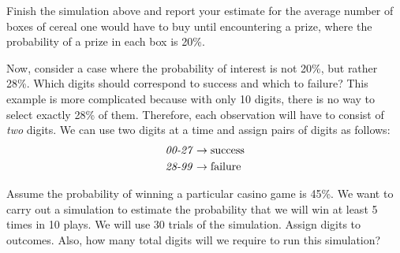 \begin{exercisewrap}
\begin{nexercise}Finish the simulation above and report your estimate for the average number of boxes of cereal one would have to buy until encountering a prize, where the probability of a prize in each box is 20\%.\footnotemark
\end{nexercise}
\end{exercisewrap}



\begin{examplewrap}
\begin{nexample}{Now, consider a case where the probability of interest is not 20\%, but rather 28\%. Which digits should correspond to success and which to failure?}
This example is more complicated because with only 10 digits, there is no way to select exactly 28\% of them. Therefore, each observation will have to consist of \emph{two} digits. We can use two digits at a time and assign pairs of digits as follows:
\begin{align*}
\text{\emph{00-27}} &\rightarrow \text{success}\\
\text{\emph{28-99}} &\rightarrow \text{failure}
\end{align*}
\end{nexample}
\end{examplewrap}

\begin{exercisewrap}
\begin{nexercise}Assume the probability of winning a particular casino game is 45\%. We want to carry out a simulation to estimate the probability that we will win at least 5 times in 10 plays. We will use 30 trials of the simulation. Assign digits to outcomes. Also, how many total digits will we require to run this simulation?\footnotemark
\end{nexercise}
\end{exercisewrap}

